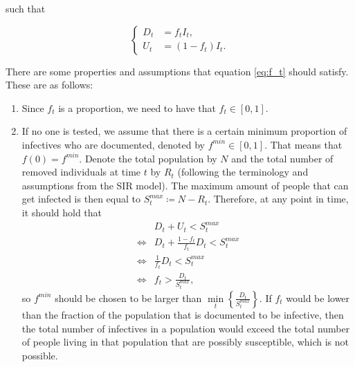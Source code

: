 \documentclass[12pt]{article}
\begin{document}
	\noindent such that
	
    	\begin{equation*}
        	\begin{cases}
            	D_t &= f_t I_t, \\
            	U_t &= (1-f_t) I_t.
        	\end{cases}
    	\end{equation*}
    	
	
	There are some properties and assumptions that equation \eqref{eq:f_t} should satisfy. These are as follows:
	\begin{enumerate}[label=(A\arabic*)]
		\item\label{ass:undoc_proportion} Since $f_t$ is a proportion, we need to have that $f_t \in [0,1]$.
		\item\label{ass:undoc_f0} If no one is tested, we assume that there is a certain minimum proportion of infectives who are documented, denoted by $f^{min} \in [0,1]$. That means that $f(0) = f^{min}$. Denote the total population by $N$ and the total number of removed individuals at time $t$ by $R_t$ (following the terminology and assumptions from the SIR model). The maximum amount of people that can get infected is then equal to $S^{max}_t \coloneqq N - R_t$. Therefore, at any point in time, it should hold that
    	    \begin{align*}
        	    & D_t + U_t < S^{max}_t \\
        	    \iff & D_t + \frac{1-f_t}{f_t}D_t < S^{max}_t \\
        	    \iff & \frac{1}{f_t}D_t < S^{max}_t \\
        	    \iff & f_t > \frac{D_t}{S^{max}_t},
    	    \end{align*}
		so $f^{min}$ should be chosen to be larger than $\min\limits_{t}\left\{\frac{D_t}{S^{max}_t}\right\}$. If $f_t$ would be lower than the fraction of the population that is documented to be infective, then the total number of infectives in a population would exceed the total number of people living in that population that are possibly susceptible, which is not possible.
		
		

\end{enumerate}
\end{document}
